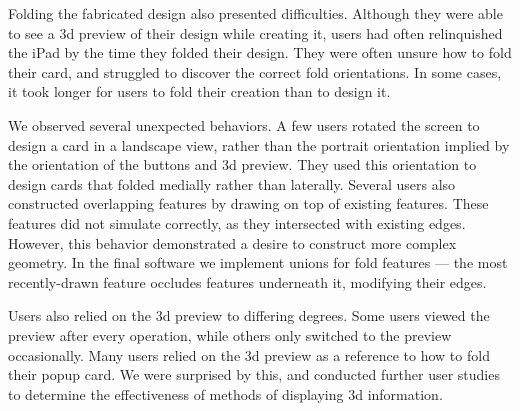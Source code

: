 Folding the fabricated design also presented difficulties. Although they
were able to see a 3d preview of their design while creating it, users
had often relinquished the iPad by the time they folded their design.
They were often unsure how to fold their card, and struggled to discover
the correct fold orientations. In some cases, it took longer for users
to fold their creation than to design it.

We observed several unexpected behaviors. A few users rotated the screen
to design a card in a landscape view, rather than the portrait
orientation implied by the orientation of the buttons and 3d preview.
They used this orientation to design cards that folded medially rather
than laterally. Several users also constructed overlapping features by
drawing on top of existing features. These features did not simulate
correctly, as they intersected with existing edges. However, this
behavior demonstrated a desire to construct more complex geometry. In
the final software we implement unions for fold features --- the most
recently-drawn feature occludes features underneath it, modifying their
edges.

Users also relied on the 3d preview to differing degrees. Some users
viewed the preview after every operation, while others only switched to
the preview occasionally. Many users relied on the 3d preview as a
reference to how to fold their popup card. We were surprised by this,
and conducted further user studies to determine the effectiveness of
methods of displaying 3d information.
